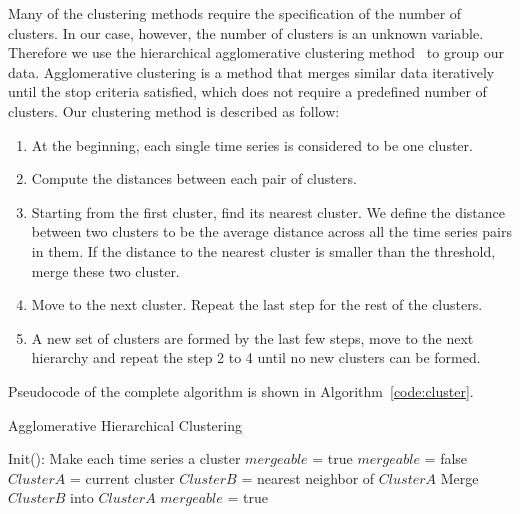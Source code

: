 Many of the clustering methods require the specification of the number of clusters. In our case, however, the number of clusters is an unknown variable. Therefore we use the hierarchical agglomerative clustering method~\citep{willett1988recent} to group our data. Agglomerative clustering is a method that merges similar data iteratively until the stop criteria satisfied, which does not require a predefined number of clusters. Our clustering method is described as follow:

\begin{enumerate}
\item At the beginning, each single time series is considered to be one cluster.
\item Compute the distances between each pair of clusters.
\item Starting from the first cluster, find its nearest cluster. We define the distance between two clusters to be the average distance across all the time series pairs in them. If the distance to the nearest cluster is smaller than the threshold, merge these two cluster.
\item Move to the next cluster. Repeat the last step for the rest of the clusters.
\item A new set of clusters are formed by the last few steps, move to the next hierarchy and repeat the step 2 to 4 until no new clusters can be formed.
\end{enumerate}

Pseudocode of the complete algorithm is shown in Algorithm~\ref{code:cluster}.

\begin{algorithm}
  \caption{Agglomerative Hierarchical Clustering}
  \begin{algorithmic}[1]
    \State Init(): Make each time series a cluster\;
    \State $mergeable$ = true\;
      \State $mergeable$ = false\;
        \State $ClusterA$ = current cluster\;
        \State $ClusterB$ = nearest neighbor of $ClusterA$\;
            \State Merge $ClusterB$ into $ClusterA$\;
            \State $mergeable$ = true\;
        \EndIf
      \EndFor
    \EndWhile
    \EndFunction
  \end{algorithmic}
  \label{code:cluster}
\end{algorithm}




